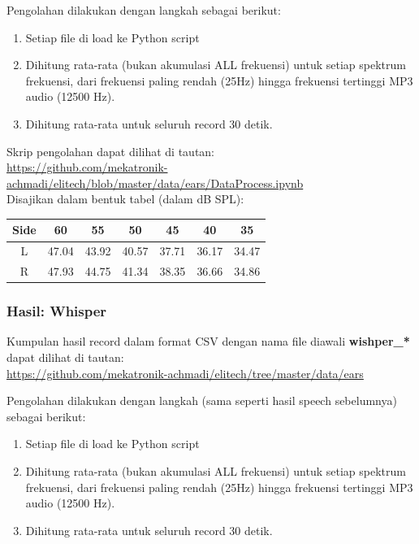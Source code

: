 \documentclass[12pt,]{article}
\begin{document}
	Pengolahan dilakukan dengan langkah sebagai berikut:
	\begin{enumerate}
		\item Setiap file di load ke Python script
		\item Dihitung rata-rata (bukan akumulasi ALL frekuensi) untuk setiap spektrum frekuensi,
		dari frekuensi paling rendah (25Hz) hingga frekuensi tertinggi MP3 audio (12500 Hz).
		\item Dihitung rata-rata untuk seluruh record 30 detik.
	\end{enumerate}

	Skrip pengolahan dapat dilihat di tautan:\\
	\url{https://github.com/mekatronik-achmadi/elitech/blob/master/data/ears/DataProcess.ipynb}\\
	
	Disajikan dalam bentuk tabel (dalam dB SPL):
	\begin{center}
		\begin{tabular}{|c|c|c|c|c|c|c|}
			\hline
			Side & 60 & 55 & 50 & 45 & 40 & 35\\ [0.5ex]
			\hline\hline
			L & 47.04 & 43.92 & 40.57 & 37.71 & 36.17 & 34.47 \\
			\hline
			R & 47.93 & 44.75 & 41.34 & 38.35 & 36.66 & 34.86 \\
			\hline
		\end{tabular}
	\end{center}

	\newpage
	\subsubsection{Hasil: Whisper}
	
	Kumpulan hasil record dalam format CSV dengan nama file diawali \textbf{wishper\_*} dapat dilihat di tautan:\\
	\url{https://github.com/mekatronik-achmadi/elitech/tree/master/data/ears}
	
	Pengolahan dilakukan dengan langkah (sama seperti hasil speech sebelumnya) sebagai berikut:
	\begin{enumerate}
		\item Setiap file di load ke Python script
		\item Dihitung rata-rata (bukan akumulasi ALL frekuensi) untuk setiap spektrum frekuensi,
		dari frekuensi paling rendah (25Hz) hingga frekuensi tertinggi MP3 audio (12500 Hz).
		\item Dihitung rata-rata untuk seluruh record 30 detik.
	\end{enumerate}
\end{document}
